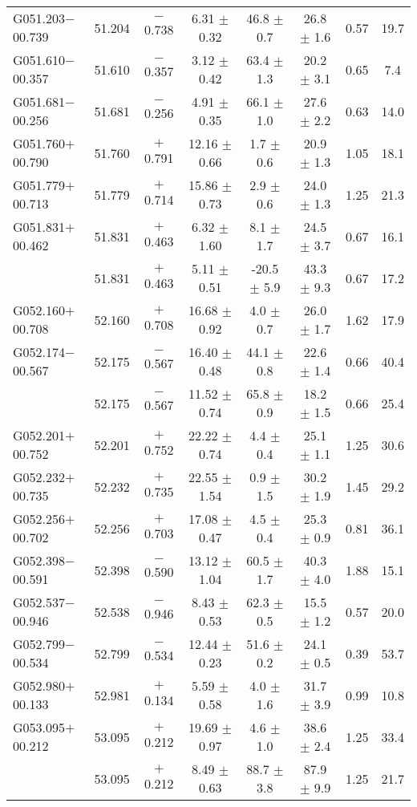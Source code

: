 \begin{ThreePartTable}
\begin{longtable}{lccccccc}
G051.203$-$00.739     &51.204&	$-$0.738	&6.31	$\pm$ 0.32	&46.8	$\pm$ 0.7	&26.8	$\pm$ 1.6	&0.57	&19.7\\
G051.610$-$00.357     &51.610&	$-$0.357	&3.12	$\pm$ 0.42	&63.4	$\pm$ 1.3	&20.2	$\pm$ 3.1	&0.65	&7.4\\
G051.681$-$00.256     &51.681&	$-$0.256	&4.91	$\pm$ 0.35	&66.1	$\pm$ 1.0	&27.6	$\pm$ 2.2	&0.63	&14.0\\
G051.760$+$00.790     &51.760&	$+$0.791	&12.16	$\pm$ 0.66	&1.7	$\pm$ 0.6	&20.9	$\pm$ 1.3	&1.05	&18.1\\
G051.779$+$00.713     &51.779&	$+$0.714	&15.86	$\pm$ 0.73	&2.9	$\pm$ 0.6	&24.0	$\pm$ 1.3	&1.25	&21.3\\
G051.831$+$00.462     &51.831&	$+$0.463	&6.32	$\pm$ 1.60	&8.1	$\pm$ 1.7	&24.5	$\pm$ 3.7	&0.67	&16.1\\
                      &51.831&	$+$0.463	&5.11	$\pm$ 0.51	&-20.5	$\pm$ 5.9	&43.3	$\pm$ 9.3	&0.67	&17.2\\
G052.160$+$00.708     &52.160&	$+$0.708	&16.68	$\pm$ 0.92	&4.0	$\pm$ 0.7	&26.0	$\pm$ 1.7	&1.62	&17.9\\
G052.174$-$00.567     &52.175&	$-$0.567	&16.40	$\pm$ 0.48	&44.1	$\pm$ 0.8	&22.6	$\pm$ 1.4	&0.66	&40.4\\
                      &52.175&	$-$0.567	&11.52	$\pm$ 0.74	&65.8	$\pm$ 0.9	&18.2	$\pm$ 1.5	&0.66	&25.4\\
G052.201$+$00.752     &52.201&	$+$0.752	&22.22	$\pm$ 0.74	&4.4	$\pm$ 0.4	&25.1	$\pm$ 1.1	&1.25	&30.6\\
G052.232$+$00.735     &52.232&	$+$0.735	&22.55	$\pm$ 1.54	&0.9	$\pm$ 1.5	&30.2	$\pm$ 1.9	&1.45	&29.2\\
G052.256$+$00.702     &52.256&	$+$0.703	&17.08	$\pm$ 0.47	&4.5	$\pm$ 0.4	&25.3	$\pm$ 0.9	&0.81	&36.1\\
G052.398$-$00.591     &52.398&	$-$0.590	&13.12	$\pm$ 1.04	&60.5	$\pm$ 1.7	&40.3	$\pm$ 4.0	&1.88	&15.1\\
G052.537$-$00.946     &52.538&	$-$0.946	&8.43	$\pm$ 0.53	&62.3	$\pm$ 0.5	&15.5	$\pm$ 1.2	&0.57	&20.0\\
G052.799$-$00.534     &52.799&	$-$0.534	&12.44	$\pm$ 0.23	&51.6	$\pm$ 0.2	&24.1	$\pm$ 0.5	&0.39	&53.7\\
G052.980$+$00.133     &52.981&	$+$0.134	&5.59	$\pm$ 0.58	&4.0	$\pm$ 1.6	&31.7	$\pm$ 3.9	&0.99	&10.8\\
G053.095$+$00.212     &53.095&	$+$0.212	&19.69	$\pm$ 0.97	&4.6	$\pm$ 1.0	&38.6	$\pm$ 2.4	&1.25	&33.4\\
                      &53.095&	$+$0.212	&8.49	$\pm$ 0.63	&88.7	$\pm$ 3.8	&87.9	$\pm$ 9.9	&1.25	&21.7\\

\end{longtable}
\end{ThreePartTable}
